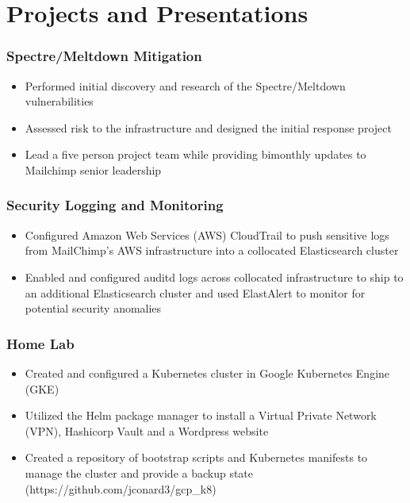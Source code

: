 \documentclass[letterpaper]{article}
\begin{document}
\section*{Projects and Presentations}
\subsubsection*{Spectre/Meltdown Mitigation}
\begin{itemize}[noitemsep]
	\item Performed initial discovery and research of the Spectre/Meltdown vulnerabilities
	\item Assessed risk to the infrastructure and designed the initial response project
	\item Lead a five person project team while providing bimonthly updates to Mailchimp senior leadership
\end{itemize}
\subsubsection*{Security Logging and Monitoring}
\begin{itemize}[noitemsep]
	\item Configured Amazon Web Services (AWS) CloudTrail to push sensitive logs from MailChimp's AWS infrastructure into a collocated Elasticsearch cluster
	\item Enabled and configured auditd logs across collocated infrastructure to ship to an additional Elasticsearch cluster and used ElastAlert to monitor for potential security anomalies
\end{itemize}
\subsubsection*{Home Lab}
\begin{itemize}[noitemsep]
	\item Created and configured a Kubernetes cluster in Google Kubernetes Engine (GKE)
	\item Utilized the Helm package manager to install a Virtual Private Network (VPN), Hashicorp Vault and a Wordpress website
	\item Created a repository of bootstrap scripts and Kubernetes manifests to manage the cluster and provide a backup state (https://github.com/jconard3/gcp\_k8)
\end{itemize}
\end{document}
